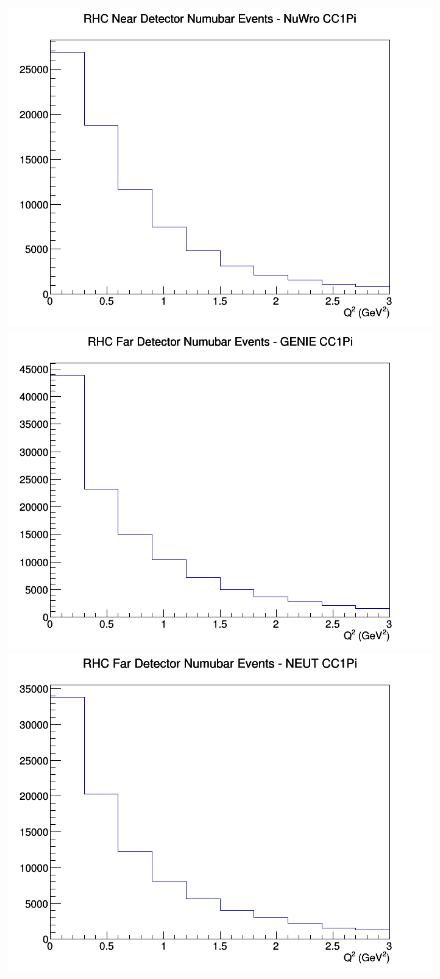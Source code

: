 \documentclass[12pt]{article}
\begin{document}
\begin{figure}[h]
\includegraphics[width=\linewidth]{eff_Q2/FGT/CC1Pi_RHC_ND_numubar_Q2_NuWro.png}
\endminipage
\newline
{}
\includegraphics[width=\linewidth]{eff_Q2/FGT/CC1Pi_RHC_FD_numubar_Q2_GENIE.png}
\endminipage
{}
\includegraphics[width=\linewidth]{eff_Q2/FGT/CC1Pi_RHC_FD_numubar_Q2_NEUT.png}

\end{figure}
\end{document}
